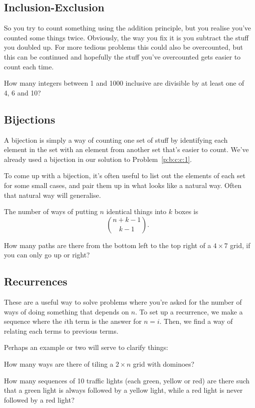 \subsection{Inclusion-Exclusion}
So you try to count something using the addition principle, but you realise
you've counted some things twice. Obviously, the way you fix it is you subtract
the stuff you doubled up. For more tedious problems this could also be
overcounted, but this can be continued and hopefully the stuff you've
overcounted gets easier to count each time.
\begin{problem}{\label{p:b:c:pie:1}}
  How many integers between 1 and 1000 inclusive are divisible by at least one
  of 4, 6 and 10?
\end{problem}
\subsection{Bijections}
A bijection is simply a way of counting one set of stuff by identifying each
element in the set with an element from another set that's easier to count.
We've already used a bijection in our solution to Problem~\ref{p:b:c:c:1}.

To come up with a bijection, it's often useful to list out the elements of each
set for some small cases, and pair them up in what looks like a natural way.
Often that natural way will generalise.

\begin{result}{\label{r:b:c:b:1}}
  The number of ways of putting $n$ identical things into $k$ boxes is
  \[\binom{n+k-1}{k-1}.\]
\end{result}
\begin{problem}{\label{p:b:c:b:1}}
  How many paths are there from the bottom left to the top right of a $4\times
  7$ grid, if you can only go up or right?
\end{problem}
\subsection{Recurrences}
These are a useful way to solve problems where you're asked for the number
of ways of doing something that depends on $n$. To set up a recurrence, we make
a sequence where the $i$th term is the answer for $n=i$. Then, we find a way of
relating each terms to previous terms.

Perhaps an example or two will serve to clarify things:
\begin{problem}{\label{p:b:c:r:1}}
  How many ways are there of tiling a $2\times n$ grid with dominoes?
\end{problem}
\begin{problem}{\label{p:b:c:r:2}}
  How many sequences of 10 traffic lights (each green, yellow or red) are there
  such that a green light is always followed by a yellow light, while a red light
  is never followed by a red light?
\end{problem}
